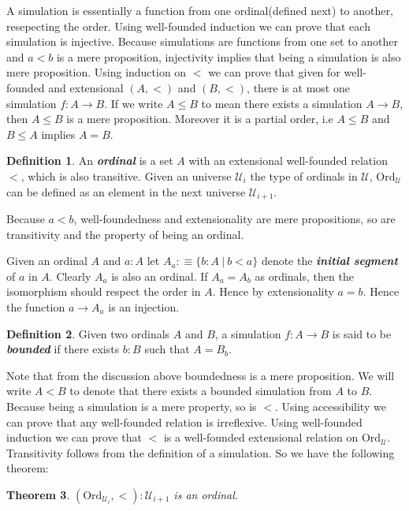\documentclass[10pt]{article}
\theoremstyle{definition}
\newtheorem{definition}{Definition}[section]
\theoremstyle{plain}
\newtheorem{theorem}[definition]{Theorem}
\theoremstyle{remark}
\newcommand{\U}{\mathscr{U}}
\begin{document}
A simulation is essentially a function from one ordinal(defined next) to another, 
resepecting the order. Using well-founded induction we can prove that each simulation is 
injective. Because simulations are functions from one set to another and $a<b$ is a mere 
proposition, injectivity implies that being a simulation is also mere proposition. Using 
induction on $<$ we can prove that given for well-founded and extensional $(A,<)$ and $(B,<)$, 
there is at most one simulation $f:A \to B$. If we write $A \leq B$ to mean there exists a 
simulation $A \to B$, then $A \leq B$ is a mere proposition. Moreover it is a partial order, 
i.e $A \leq B$ and $B \leq A$ implies $A = B$. 

\begin{definition}\label{D:Ordinal}
An \textbf{\textit{ordinal}} is a set $A$ with an extensional well-founded relation $<$, which
is also transitive. Given an universe $\U_i$ the type of ordinals in $\U$, $\text{Ord}_{\U}$
can be defined as an element in the next universe $\U_{i+1}$.
\end{definition}

Because $a < b$, well-foundedness and extensionality are mere propositions, so are
transitivity and the property of being an ordinal.\smallskip

Given an ordinal $A$ and $a : A$ let $A_a :\equiv \{ b : A\ |\ b < a\}$ denote the 
\textbf{\textit{initial segment}} of $a$ in $A$. Clearly $A_a$ is also an ordinal. If 
$A_a = A_b$ as ordinals, then the isomorphism should respect the order in $A$. Hence by 
extensionality $a = b$. Hence the function $a \to A_a$ is an injection.

\begin{definition}\label{D:Bdd sim}
Given two ordinals $A$ and $B$, a simulation $f : A \to B$ is said to be 
\textbf{\textit{bounded}} if there exists $b : B$ such that $A = B_b$. 
\end{definition}

Note that from the discussion above boundedness is a mere proposition. We will write 
$A < B$ to denote that there exists a bounded simulation from $A$ to $B$. Because being a 
simulation is a mere property, so is $<$. Using accessibility we can prove that any 
well-founded relation is irreflexive. Using well-founded induction we can prove that $<$
is a well-founded extensional relation on $\text{Ord}_{\U}$. Transitivity follows from 
the definition of a simulation. So we have the following theorem:
\begin{theorem}
$(\text{Ord}_{\U_i},<) : \U_{i+1}$ is an ordinal.
\end{theorem}
\end{document}

